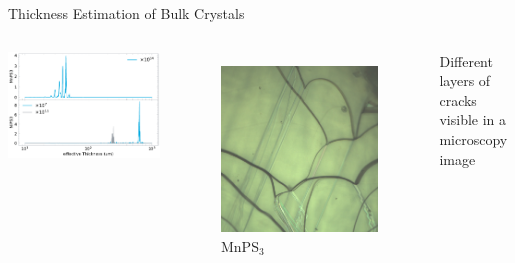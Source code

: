 \documentclass[
	10pt,
]{beamer}
\begin{document}
\begin{frame}{Thickness Estimation of Bulk Crystals}
	\begin{columns}
		\centering
		\includegraphics[width=\textwidth]{../figures/2024-03-14 thickness .pdf}
		
		\begin{figure}
			\centering
			\includegraphics[width=\textwidth]{../../data/2023-11-02/i001_MnPS3_50x_a.png}
			MnPS$_3$
		\end{figure}
		Different layers of cracks visible in a microscopy image


\end{columns}
\end{frame}
\end{document}
